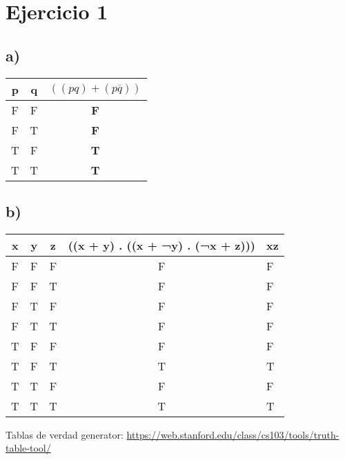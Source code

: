 \section*{Ejercicio 1}

\subsection*{a)}
\begin{table}[htbp]
    \begin{tabular}{|c|c|c|}
    \hline
    \textbf{p} & \textbf{q} & \textbf{$((pq) + (p\overline{q}))$} \\ \hline
    F          & F          & \textbf{F}                    \\ \hline
    F          & T          & \textbf{F}                    \\ \hline
    T          & F          & \textbf{T}                    \\ \hline
    T          & T          & \textbf{T}                    \\ \hline
    \end{tabular}
\end{table}

\subsection*{b)}

\begin{table}[htbp]
    \begin{tabular}{|c|c|c|c|l|}
    \hline
    \textbf{x} & \textbf{y} & \textbf{z} & \textbf{((x + y) . ((x + ¬y) . (¬x + z)))} & xz \\ \hline
    F          & F          & F          & F                                          & F  \\ \hline
    F          & F          & T          & F                                          & F  \\ \hline
    F          & T          & F          & F                                          & F  \\ \hline
    F          & T          & T          & F                                          & F  \\ \hline
    T          & F          & F          & F                                          & F  \\ \hline
    T          & F          & T          & T                                          & T  \\ \hline
    T          & T          & F          & F                                          & F  \\ \hline
    T          & T          & T          & T                                          & T  \\ \hline
    \end{tabular}
    \end{table}

Tablas de verdad generator: \url{https://web.stanford.edu/class/cs103/tools/truth-table-tool/}